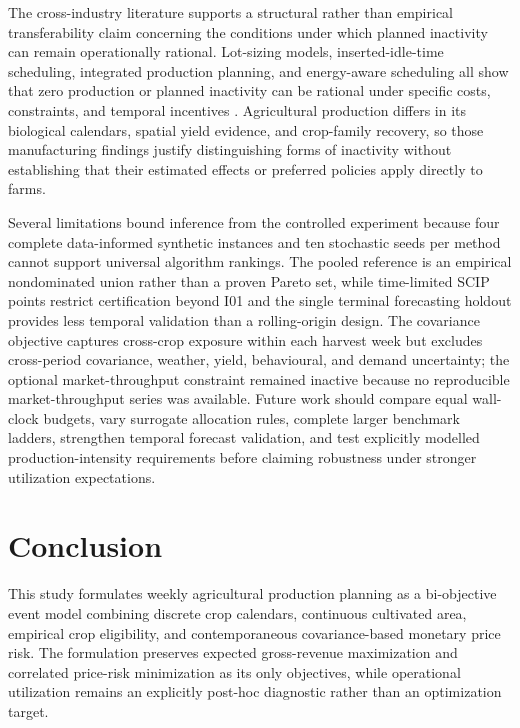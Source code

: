 \documentclass[]{interact}
\begin{document}
The cross-industry literature supports a structural rather than empirical transferability claim concerning the conditions under which planned inactivity can remain operationally rational. Lot-sizing models, inserted-idle-time scheduling, integrated production planning, and energy-aware scheduling all show that zero production or planned inactivity can be rational under specific costs, constraints, and temporal incentives \citep{WagnerWhitin1958,KanetSridharan2000,Jodlbauer2006,TrevinoMartinez2022,An2023}. Agricultural production differs in its biological calendars, spatial yield evidence, and crop-family recovery, so those manufacturing findings justify distinguishing forms of inactivity without establishing that their estimated effects or preferred policies apply directly to farms.

Several limitations bound inference from the controlled experiment because four complete data-informed synthetic instances and ten stochastic seeds per method cannot support universal algorithm rankings. The pooled reference is an empirical nondominated union rather than a proven Pareto set, while time-limited SCIP points restrict certification beyond I01 and the single terminal forecasting holdout provides less temporal validation than a rolling-origin design. The covariance objective captures cross-crop exposure within each harvest week but excludes cross-period covariance, weather, yield, behavioural, and demand uncertainty; the optional market-throughput constraint remained inactive because no reproducible market-throughput series was available. Future work should compare equal wall-clock budgets, vary surrogate allocation rules, complete larger benchmark ladders, strengthen temporal forecast validation, and test explicitly modelled production-intensity requirements before claiming robustness under stronger utilization expectations.

\section{Conclusion}

This study formulates weekly agricultural production planning as a bi-objective event model combining discrete crop calendars, continuous cultivated area, empirical crop eligibility, and contemporaneous covariance-based monetary price risk. The formulation preserves expected gross-revenue maximization and correlated price-risk minimization as its only objectives, while operational utilization remains an explicitly post-hoc diagnostic rather than an optimization target.
\end{document}
